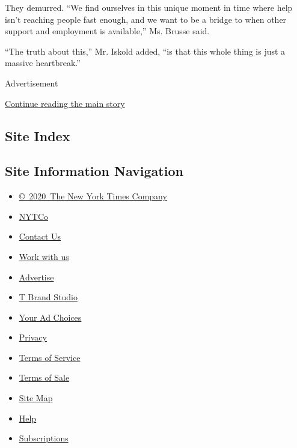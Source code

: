 They demurred. ``We find ourselves in this unique moment in time where
help isn't reaching people fast enough, and we want to be a bridge to
when other support and employment is available,'' Ms. Brusse said.

``The truth about this,'' Mr. Iskold added, ``is that this whole thing
is just a massive heartbreak.''

Advertisement

\protect\hyperlink{after-bottom}{Continue reading the main story}

\hypertarget{site-index}{%
\subsection{Site Index}\label{site-index}}

\hypertarget{site-information-navigation}{%
\subsection{Site Information
Navigation}\label{site-information-navigation}}

\begin{itemize}
\tightlist
\item
  \href{https://help.nytimes3xbfgragh.onion/hc/en-us/articles/115014792127-Copyright-notice}{©~2020~The
  New York Times Company}
\end{itemize}

\begin{itemize}
\tightlist
\item
  \href{https://www.nytco.com/}{NYTCo}
\item
  \href{https://help.nytimes3xbfgragh.onion/hc/en-us/articles/115015385887-Contact-Us}{Contact
  Us}
\item
  \href{https://www.nytco.com/careers/}{Work with us}
\item
  \href{https://nytmediakit.com/}{Advertise}
\item
  \href{http://www.tbrandstudio.com/}{T Brand Studio}
\item
  \href{https://www.nytimes3xbfgragh.onion/privacy/cookie-policy\#how-do-i-manage-trackers}{Your
  Ad Choices}
\item
  \href{https://www.nytimes3xbfgragh.onion/privacy}{Privacy}
\item
  \href{https://help.nytimes3xbfgragh.onion/hc/en-us/articles/115014893428-Terms-of-service}{Terms
  of Service}
\item
  \href{https://help.nytimes3xbfgragh.onion/hc/en-us/articles/115014893968-Terms-of-sale}{Terms
  of Sale}
\item
  \href{https://spiderbites.nytimes3xbfgragh.onion}{Site Map}
\item
  \href{https://help.nytimes3xbfgragh.onion/hc/en-us}{Help}
\item
  \href{https://www.nytimes3xbfgragh.onion/subscription?campaignId=37WXW}{Subscriptions}
\end{itemize}
